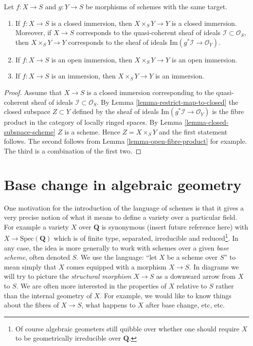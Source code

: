 \begin{lemma}
\label{lemma-fibre-product-immersion}
Let $f : X \to S$ and $g : Y \to S$ be morphisms of schemes
with the same target.
\begin{enumerate}
\item If $f : X \to S$ is a closed immersion,
then $X\times_S Y \to Y$ is a closed immersion.
Moreover, if $X \to S$ corresponds to the quasi-coherent
sheaf of ideals $\mathcal{I} \subset \mathcal{O}_S$, then
$X \times_S Y \to Y$ corresponds to the sheaf of ideals
$\text{Im}(g^*\mathcal{I} \to \mathcal{O}_Y)$.
\item If $f : X \to S$ is an open immersion,
then $X\times_S Y \to Y$ is an open immersion.
\item If $f : X \to S$ is an immersion,
then $X\times_S Y \to Y$ is an immersion.
\end{enumerate}
\end{lemma}

\begin{proof}
Assume that $X \to S$ is a closed immersion corresponding
to the quasi-coherent sheaf of ideals $\mathcal{I} \subset \mathcal{O}_S$.
By Lemma \ref{lemma-restrict-map-to-closed} the closed subspace
$Z \subset Y$ defined by the sheaf of ideals
$\text{Im}(g^*\mathcal{I} \to \mathcal{O}_Y)$ is the fibre product
in the category of locally ringed spaces.
By Lemma \ref{lemma-closed-subspace-scheme} $Z$ is a scheme.
Hence $Z = X \times_S Y$ and the first statement follows.
The second follows from Lemma \ref{lemma-open-fibre-product}
for example. The third is a combination of
the first two.
\end{proof}










\section{Base change in algebraic geometry}
\label{section-base-change}

\noindent
One motivation for the introduction of the language of schemes
is that it gives a very precise notion of what it means to
define a variety over a particular field. For example a variety
$X$ over $\mathbf{Q}$ is synonymous (insert future reference here)
with $X \to \text{Spec}(\mathbf{Q})$ which is of finite type,
separated, irreducible and reduced\footnote{Of course algebraic
geometers still quibble over whether one should require $X$ to be
geometrically irreducible over $\mathbf{Q}$.}. In any case, the idea
is more generally to work with schemes over a given {\it base scheme},
often denoted $S$. We use the language: ``let $X$ be a scheme over $S$''
to mean simply that $X$ comes equipped with a morphism $X \to S$.
In diagrams we will try to picture the {\it structural morphism}
$X \to S$ as a downward arrow from $X$ to $S$.
We are often more interested in the properties of $X$ relative
to $S$ rather than the internal geometry of $X$.
For example, we would like to know things about the fibres of $X \to S$,
what happens to $X$ after base change, etc, etc.

